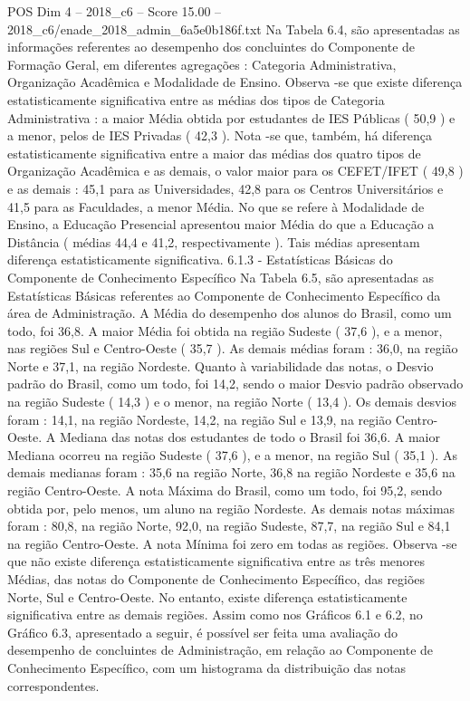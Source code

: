 \begin{textsample}{POS Dim 4 – 2018\_c6 – Score 15.00 – 2018\_c6/enade\_2018\_admin\_6a5e0b186f.txt}
Na Tabela 6.4, são apresentadas as informações referentes ao desempenho dos concluintes do Componente de Formação Geral, em diferentes agregações : Categoria Administrativa, Organização Acadêmica e Modalidade de Ensino.
Observa -se que existe diferença estatisticamente significativa entre as médias dos tipos de Categoria Administrativa : a maior Média obtida por estudantes de IES Públicas ( 50,9 ) e a menor, pelos de IES Privadas ( 42,3 ).
Nota -se que, também, há diferença estatisticamente significativa entre a maior das médias dos quatro tipos de Organização Acadêmica e as demais, o valor maior para os CEFET/IFET ( 49,8 ) e as demais : 45,1 para as Universidades, 42,8 para os Centros Universitários e 41,5 para as Faculdades, a menor Média.
No que se refere à Modalidade de Ensino, a Educação Presencial apresentou maior Média do que a Educação a Distância ( médias 44,4 e 41,2, respectivamente ).
Tais médias apresentam diferença estatisticamente significativa. 6.1.3 - Estatísticas Básicas do Componente de Conhecimento Específico Na Tabela 6.5, são apresentadas as Estatísticas Básicas referentes ao Componente de Conhecimento Específico da área de Administração.
A Média do desempenho dos alunos do Brasil, como um todo, foi 36,8.
A maior Média foi obtida na região Sudeste ( 37,6 ), e a menor, nas regiões Sul e Centro-Oeste ( 35,7 ).
As demais médias foram : 36,0, na região Norte e 37,1, na região Nordeste.
Quanto à variabilidade das notas, o Desvio padrão do Brasil, como um todo, foi 14,2, sendo o maior Desvio padrão observado na região Sudeste ( 14,3 ) e o menor, na região Norte ( 13,4 ).
Os demais desvios foram : 14,1, na região Nordeste, 14,2, na região Sul e 13,9, na região Centro-Oeste.
A Mediana das notas dos estudantes de todo o Brasil foi 36,6.
A maior Mediana ocorreu na região Sudeste ( 37,6 ), e a menor, na região Sul ( 35,1 ).
As demais medianas foram : 35,6 na região Norte, 36,8 na região Nordeste e 35,6 na região Centro-Oeste.
A nota Máxima do Brasil, como um todo, foi 95,2, sendo obtida por, pelo menos, um aluno na região Nordeste.
As demais notas máximas foram : 80,8, na região Norte, 92,0, na região Sudeste, 87,7, na região Sul e 84,1 na região Centro-Oeste.
A nota Mínima foi zero em todas as regiões.
Observa -se que não existe diferença estatisticamente significativa entre as três menores Médias, das notas do Componente de Conhecimento Específico, das regiões Norte, Sul e Centro-Oeste.
No entanto, existe diferença estatisticamente significativa entre as demais regiões.
Assim como nos Gráficos 6.1 e 6.2, no Gráfico 6.3, apresentado a seguir, é possível ser feita uma avaliação do desempenho de concluintes de Administração, em relação ao Componente de Conhecimento Específico, com um histograma da distribuição das notas correspondentes.

\end{textsample}
